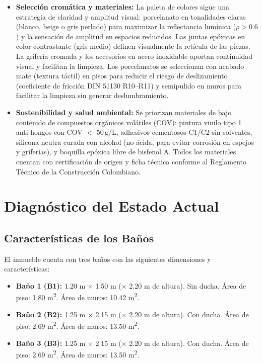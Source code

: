 ﻿\documentclass[12pt]{article}
\begin{document}
\begin{itemize}[noitemsep]
  \item {\bfseries Selección cromática y materiales:} La paleta de colores
  sigue una estrategia de claridad y amplitud visual: porcelanato en tonalidades
  claras (blanco, beige o gris perlado) para maximizar la reflectancia lumínica
  ($\rho > 0.6$) y la sensación de amplitud en espacios reducidos. Las juntas
  epóxicas en color contrastante (gris medio) definen visualmente la retícula
  de las piezas. La grifería cromada y los accesorios en acero inoxidable aportan
  continuidad visual y facilitan la limpieza. Los porcelanatos se seleccionan
  con acabado mate (textura táctil) en pisos para reducir el riesgo de
  deslizamiento (coeficiente de fricción DIN 51130 R10--R11) y semipulido en
  muros para facilitar la limpieza sin generar deslumbramiento.
  \item {\bfseries Sostenibilidad y salud ambiental:} Se priorizan materiales
  de bajo contenido de compuestos orgánicos volátiles (COV): pintura vinilo
  tipo 1 anti-hongos con COV $<$ 50\,g/L, adhesivos cementosos C1/C2 sin
  solventes, silicona neutra curada con alcohol (no ácida, para evitar
  corrosión en espejos y griferías), y boquilla epóxica libre de bisfenol A.
  Todos los materiales cuentan con certificación de origen y ficha técnica
  conforme al Reglamento Técnico de la Construcción Colombiano.
\end{itemize}

\section{Diagnóstico del Estado Actual}

\subsection{Características de los Baños}

El inmueble cuenta con tres baños con las siguientes dimensiones y características:

\begin{itemize}[noitemsep]
  \item {\bfseries Baño 1 (B1):} 1.20 m $\times$ 1.50 m ($\times$ 2.20 m de altura). Sin ducha. \'Area de piso: 1.80 m\textsuperscript{2}. \'Area de muros: 10.42 m\textsuperscript{2}.
  \item {\bfseries Baño 2 (B2):} 1.25 m $\times$ 2.15 m ($\times$ 2.20 m de altura). Con ducha. \'Area de piso: 2.69 m\textsuperscript{2}. \'Area de muros: 13.50 m\textsuperscript{2}.
  \item {\bfseries Baño 3 (B3):} 1.25 m $\times$ 2.15 m ($\times$ 2.20 m de altura). Con ducha. \'Area de piso: 2.69 m\textsuperscript{2}. \'Area de muros: 13.50 m\textsuperscript{2}.
\end{itemize}
\end{document}
